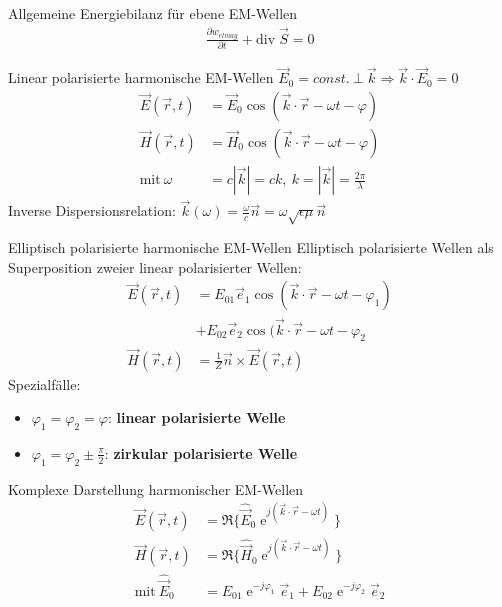\documentclass[a6paper]{kartei}
\renewcommand{\div}{\mathrm{div}\;}
\begin{document}
\begin{karte}{Allgemeine Energiebilanz für ebene EM-Wellen}
\begin{align}
\frac{\partial w_{elmag}}{\partial t} + \div \vec{S} = 0
\end{align}
\end{karte}

\begin{karte}{Linear polarisierte harmonische EM-Wellen}
$\vec{E}_{0} = const. \ \bot \ \vec{k} \Rightarrow \vec{k} \cdot \vec{E}_{0} = 0$
\begin{align}
\vec{E}(\vec{r},t) & = \vec{E}_{0} \cos(\vec{k} \cdot \vec{r} - \omega t - \varphi) \\
\vec{H}(\vec{r},t) & = \vec{H}_{0} \cos(\vec{k} \cdot \vec{r} - \omega t - \varphi) \\
\text{mit} \ \omega & = c |\vec{k}| = ck, \ k = |\vec{k}| = \frac{2\pi}{\lambda} \nonumber
\end{align}
Inverse Dispersionsrelation: $\vec{k}(\omega) = \frac{\omega}{c} \vec{n} = \omega \sqrt{\epsilon \mu} \vec{n}$
\end{karte}

\begin{karte}{Elliptisch polarisierte harmonische EM-Wellen}
Elliptisch polarisierte Wellen als Superposition zweier linear polarisierter Wellen:
\begin{align}
\vec{E}(\vec{r},t) & = E_{01} \vec{e}_{1} \cos(\vec{k} \cdot \vec{r} - \omega t - \varphi_{1}) \\
& +E_{02} \vec{e}_{2} \cos(\vec{k} \cdot \vec{r} - \omega t - \varphi_{2} \nonumber \\
\vec{H}(\vec{r},t) & =  \frac{1}{Z} \vec{n} \times \vec{E}(\vec{r},t)
\end{align}
Spezialfälle:
\begin{itemize}
\item $\varphi_{1} = \varphi_{2} = \varphi$: \textbf{linear polarisierte Welle}
\item $\varphi_{1} = \varphi_{2} \pm \frac{\pi}{2}$: \textbf{zirkular polarisierte Welle}
\end{itemize}
\end{karte}

\begin{karte}{Komplexe Darstellung harmonischer EM-Wellen}
\begin{align}
\vec{E}(\vec{r},t) & = \Re \{ \hat{\vec{E}}_{0} \operatorname{e}^{j(\vec{k} \cdot \vec{r} - \omega t)} \} \\
\vec{H}(\vec{r},t) & = \Re \{ \hat{\vec{H}}_{0} \operatorname{e}^{j(\vec{k} \cdot \vec{r} - \omega t)} \} \\
\text{mit} \ \hat{\vec{E}}_{0} & = E_{01} \operatorname{e}^{-j\varphi_{1}} \vec{e}_{1} + E_{02} \operatorname{e}^{-j\varphi_{2}} \vec{e}_{2}
\end{align}
\end{karte}
\end{document}
